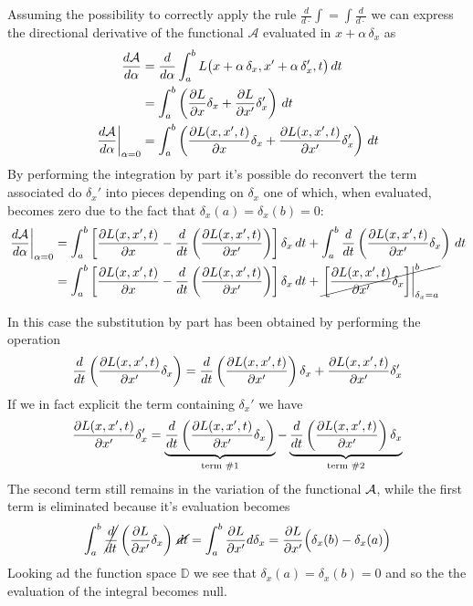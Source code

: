	Assuming the possibility to correctly apply the rule $\frac{d}{d\cdot} \int = \int \frac{d}{d\cdot}$ we can express the directional derivative of the functional $\mathcal A$ evaluated in $x+ \alpha\, \delta_x$ as
	\begin{align*}
		\frac{d\mathcal A}{d\alpha} & = \frac{d}{d\alpha} \int_a^b L \big( x + \alpha\, \delta_x ,x' + \alpha\, \delta_x', t\big)\, dt \\
		& = \int_a^b \left(\frac{\partial L }{\partial x} \delta_x + \frac{\partial L }{\partial x'} \delta_x'\right)\, dt \\
		\left. \frac{d\mathcal A}{d\alpha} \right|_{\alpha = 0} & = \int_a^b \left( \frac{\partial L (x,x',t)}{\partial x} \delta_x + \frac{\partial L (x,x',t)}{\partial x'} \delta_x' \right)\, dt 
	\end{align*}
	By performing the integration by part it's possible do reconvert the term associated do $\delta_x'$ into pieces depending on $\delta_x$ one of which, when evaluated, becomes zero due to the fact that $\delta_x(a) = \delta_x(b) = 0$:
	\begin{align*}
		\left. \frac{d\mathcal A}{d\alpha} \right|_{\alpha = 0} & = \int_a^b \left[ \frac{\partial L (x,x',t)}{\partial x} - \frac{d}{dt} \left( \frac{\partial L (x,x',t)}{\partial x'} \right) \right] \delta_x\, dt + \int_a^b\frac{d}{dt}\left( \frac{\partial L (x,x',t)}{\partial x'}\delta_x \right) \, dt \\
		& = \int_a^b \left[ \frac{\partial L (x,x',t)}{\partial x} - \frac{d}{dt} \left( \frac{\partial L (x,x',t)}{\partial x'} \right) \right] \delta_x\, dt + \cancel{\left. \left[ \frac{\partial L (x,x',t)}{\partial x'}\delta_x \right] \right|_{\delta_x = a}^b} \\
	\end{align*}
	
	\begin{note}
		In this case the substitution by part has been obtained by performing the operation
		\[ \frac d {dt} \left( \frac{\partial L(x,x',t)}{\partial x'} \delta_x \right) = \frac d{dt} \left( \frac{\partial L(x,x',t)}{\partial x'}\right) \delta_x + \frac{\partial L(x,x',t)}{\partial x'} \delta_x' \]
		If we in fact explicit the term containing $\delta_x'$ we have
		\[ \frac{\partial L(x,x',t)}{\partial x'} \delta_x' = \underbrace{\frac d {dt} \left( \frac{\partial L(x,x',t)}{\partial x'} \delta_x \right)}_\textrm{term \#1} - \underbrace{\frac d{dt} \left( \frac{\partial L(x,x',t)}{\partial x'}\right) \delta_x}_\textrm{term \#2} \]
		The second term still remains in the variation of the functional $\mathcal{A}$, while the first term is eliminated because it's evaluation becomes
		\[ \int_a^b\cancel{\frac{d}{dt}}\left( \frac{\partial L}{\partial x'}\delta_x \right) \,\cancel{dt} = \int_a^b \frac{\partial L}{\partial x'} d\delta_x = \frac{\partial L}{\partial x'} \Big(\delta_x(b) - \delta_x(a)\Big)  \]
		Looking ad the function space $\mathds D$ we see that $\delta_x(a) = \delta_x(b) = 0$ and so the the evaluation of the integral becomes null.
	\end{note}

